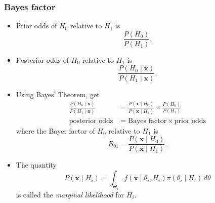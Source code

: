 \subsubsection{Bayes factor}
\begin{itemize}
	\item Prior odds of $H_0$ relative to $H_1$ is \[ \frac{P(H_0)}{P(H_1)}. \]
	\item Posterior odds of $H_0$ relative to $H_1$ is \[ \frac{P(H_0 \mid \mathbf{x})}{P(H_1 \mid \mathbf{x})}. \]
	\item Using Bayes' Theorem, get 
	\begin{align*}
		\frac{P(H_0 \mid \mathbf{x})}{P(H_1 \mid \mathbf{x})} &= \frac{P(\mathbf{x} \mid H_0)}{P(\mathbf{x} \mid H_1)} \times \frac{P(H_0)}{P(H_1)} \\
		\text{posterior odds} &= \text{Bayes factor} \times \text{prior odds}
	\end{align*}
	where the Bayes factor of $H_0$ relative to $H_1$ is
	\[ B_{01} = \frac{P(\mathbf{x} \mid H_0)}{P(\mathbf{x} \mid H_1)}.\]
	\item The quantity
	\[ P(\mathbf{x} \mid H_i) = \int_{\Theta_i} f(\mathbf{x} \mid \theta_i,H_i) \pi(\theta_i \mid H_i)\,d\theta \]
	is called the \textit{marginal likelihood} for $H_i.$
\end{itemize}